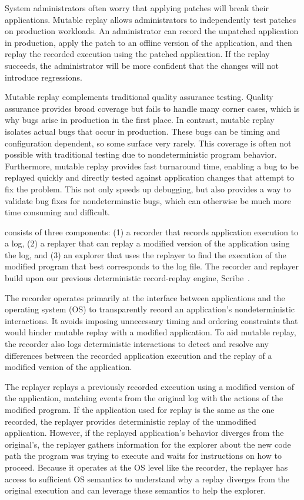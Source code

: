 System administrators often worry that applying patches
will break their applications.  Mutable replay allows administrators
to independently test patches on production workloads.  An
administrator can record the unpatched application in production,
apply the patch to an offline version of the application, and then replay
the recorded execution using the patched application.  If the
replay succeeds, the administrator will be more confident that
the changes will not introduce regressions.

Mutable replay complements traditional quality assurance
testing.  Quality assurance provides broad coverage but fails to
handle many corner cases, which is why bugs arise in production in the
first place.  In contrast, mutable replay isolates
actual bugs that occur in production. These bugs can be timing and
configuration dependent, so some surface very rarely. This coverage is often
not possible with traditional testing
due to nondeterministic program behavior.  Furthermore, mutable replay
provides fast turnaround time, enabling a bug to be replayed quickly
and directly tested against application changes that attempt to fix
the problem.
This not only speeds up debugging, but also provides a
way to validate bug fixes for nondeterminstic bugs, which can
otherwise be much more time consuming and difficult.

{\dora} consists of three components: (1) a recorder that records
application execution to a log, (2) a replayer that can replay a
modified version of the application using the log, and (3) an explorer
that uses the replayer to find the execution of the modified program
that best corresponds to the log file. The recorder and replayer build
upon our previous deterministic record-replay engine,
Scribe~\cite{scribe:sigmetrics10}.

The recorder operates primarily at the interface between applications and the
operating system (OS) to transparently record an application's nondeterministic
interactions. It avoids imposing unnecessary timing and ordering constraints
that would hinder mutable replay with a modified application.  To aid mutable
replay, the recorder also logs deterministic interactions to detect and
resolve any differences between the recorded application execution and the
replay of a modified version of the application.

The replayer replays a previously recorded execution using a modified version
of the application, matching events from the original
log with the actions of the modified program.
If the application used for replay is the same as the one recorded, the replayer
provides deterministic replay of the unmodified application.  However,
if the replayed application's behavior diverges from the original's,
the replayer gathers information for the explorer about the new code
path the program was trying to execute and waits for instructions on
how to proceed.  Because it operates at the OS level like the
recorder, the replayer has access to sufficient OS semantics to
understand why a replay diverges from the original execution and can
leverage these semantics to help the explorer.

